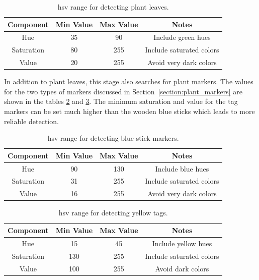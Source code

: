 \begin{table}
    \begin{center}
    \caption[Plant leaf detection values]{\ac{hsv} range for detecting plant leaves.}
    \begin{tabular}[c]{|c|c|c|c|}
        \hline
        Component & Min Value & Max Value & Notes \\
        \hline
        Hue        & 35  & 90  & Include green hues        \\
        Saturation & 80  & 255 & Include saturated colors  \\
        Value      & 20  & 255 & Avoid very dark colors    \\
        \hline
    \end{tabular}
    \label{table:plant_leaves_hsv_ranges}
   \end{center}
\end{table}

In addition to plant leaves, this stage also searches for plant markers.  The values for the two types of markers discussed in Section~\ref{section:plant_markers} are shown in the tables \ref{table:stick_hsv_ranges} and \ref{table:tag_ranges}.  The minimum saturation and value for the tag markers can be set much higher than the wooden blue sticks which leads to more reliable detection.   

\begin{table}
    \begin{center}
    \caption[Blue stick detection values]{\ac{hsv} range for detecting blue stick markers.}
    \begin{tabular}[c]{|c|c|c|c|}
        \hline
        Component & Min Value & Max Value & Notes \\
        \hline
        Hue        & 90  & 130 & Include blue hues        \\
        Saturation & 31  & 255 & Include saturated colors  \\
        Value      & 16  & 255 & Avoid very dark colors    \\
        \hline
    \end{tabular}
    \label{table:stick_hsv_ranges}
   \end{center}
\end{table}

\begin{table}
    \begin{center}
    \caption[Yellow tags detection values]{\ac{hsv} range for detecting yellow tags.}
    \begin{tabular}[c]{|c|c|c|c|}
        \hline
        Component & Min Value & Max Value & Notes \\
        \hline
        Hue        & 15  & 45  & Include yellow hues       \\
        Saturation & 130 & 255 & Include saturated colors  \\
        Value      & 100 & 255 & Avoid dark colors         \\
        \hline
    \end{tabular}
    \label{table:tag_ranges}
   \end{center}
\end{table}

